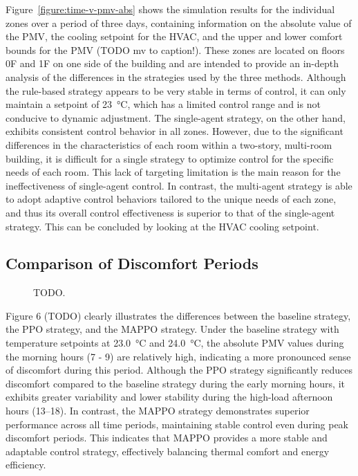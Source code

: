 \documentclass[preprint,12pt]{elsarticle}
\newcommand{\figurestorepath}{../packages/hvacmarl6e43_notebooks/__datastore__}
\begin{document}
Figure~\ref{figure:time-v-pmv-abs} shows the simulation results for the individual zones
over a period of three days, containing information on the absolute value of the PMV, 
the cooling setpoint for the HVAC, and the upper and lower comfort bounds for the PMV (TODO mv to caption!). 
These zones are located on floors 0F and 1F on one side of the building and are intended 
to provide an in-depth analysis of the differences in the strategies used by the three methods. 
Although the rule-based strategy appears to be very stable in terms of control, 
it can only maintain a setpoint of \SI{23}{\celsius}, which has a limited control range 
and is not conducive to dynamic adjustment. 
The single-agent strategy, on the other hand, exhibits consistent control behavior in all zones. 
However, due to the significant differences in the characteristics of each room within 
a two-story, multi-room building, it is difficult for a single strategy to optimize control 
for the specific needs of each room. This lack of targeting limitation is the main reason 
for the ineffectiveness of single-agent control. 
In contrast, the multi-agent strategy is able to adopt adaptive control behaviors tailored 
to the unique needs of each zone, and thus its overall control effectiveness is superior to 
that of the single-agent strategy. This can be concluded by looking at the HVAC cooling setpoint.

\subsection{Comparison of Discomfort Periods}

\begin{figure}[H]
    \centering
    \caption{TODO.}
\end{figure}

Figure 6 (TODO) clearly illustrates the differences between the baseline strategy, the PPO strategy, and the MAPPO strategy. 
Under the baseline strategy with temperature setpoints at \SI{23.0}{\celsius} and \SI{24.0}{\celsius}, 
the absolute PMV values during the morning hours (7 - 9) are relatively high, indicating a more pronounced sense of discomfort during this period. 
Although the PPO strategy significantly reduces discomfort compared to the baseline strategy during the early morning hours, 
it exhibits greater variability and lower stability during the high-load afternoon hours (13--18). 
In contrast, the MAPPO strategy demonstrates superior performance across all time periods, 
maintaining stable control even during peak discomfort periods. 
This indicates that MAPPO provides a more stable and adaptable control strategy, 
effectively balancing thermal comfort and energy efficiency.
\end{document}
